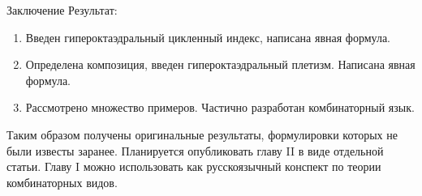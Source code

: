 \documentclass{beamer}
\begin{document}
\begin{frame}{Заключение}
Результат:
\begin{enumerate}[*]
\item Введен гипероктаэдральный цикленный индекс, написана явная формула.
\item Определена композиция, введен гипероктаэдральный плетизм. Написана явная
формула.
\item Рассмотрено множество примеров. Частично разработан комбинаторный язык.
\end{enumerate}

Таким образом получены оригинальные результаты, формулировки которых
не были известы заранее. Планируется опубликовать главу II в виде отдельной
статьи. Главу I можно использовать как русскоязычный конспект по теории
комбинаторных видов.

\end{frame}
\end{document}
